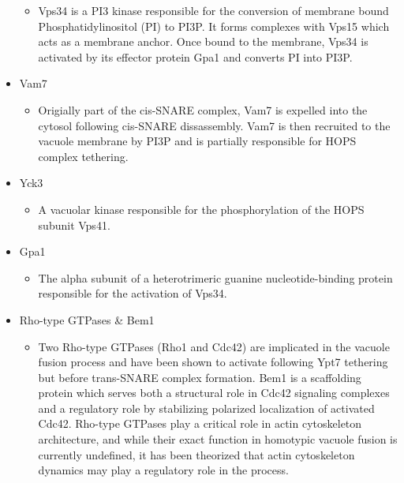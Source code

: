 \documentclass[12pt,twoside]{reedthesis}
\providecommand{\tightlist}{%
  \setlength{\itemsep}{0pt}\setlength{\parskip}{0pt}}
\begin{document}
\begin{itemize}
  \begin{itemize}
  \tightlist
  \item
    Vps34 is a PI3 kinase responsible for the conversion of membrane bound Phosphatidylinositol (PI) to PI3P. It forms complexes with Vps15 which acts as a membrane anchor. Once bound to the membrane, Vps34 is activated by its effector protein Gpa1 and converts PI into PI3P.
  \end{itemize}
\item
  Vam7

  \begin{itemize}
  \tightlist
  \item
    Origially part of the cis-SNARE complex, Vam7 is expelled into the cytosol following cis-SNARE dissassembly. Vam7 is then recruited to the vacuole membrane by PI3P and is partially responsible for HOPS complex tethering.
    \newpage
  \end{itemize}
\item
  Yck3

  \begin{itemize}
  \tightlist
  \item
    A vacuolar kinase responsible for the phosphorylation of the HOPS subunit Vps41.
  \end{itemize}
\item
  Gpa1

  \begin{itemize}
  \tightlist
  \item
    The alpha subunit of a heterotrimeric guanine nucleotide-binding protein responsible for the activation of Vps34.
  \end{itemize}
\item
  Rho-type GTPases \& Bem1

  \begin{itemize}
  \tightlist
  \item
    Two Rho-type GTPases (Rho1 and Cdc42) are implicated in the vacuole fusion process and have been shown to activate following Ypt7 tethering but before trans-SNARE complex formation. Bem1 is a scaffolding protein which serves both a structural role in Cdc42 signaling complexes and a regulatory role by stabilizing polarized localization of activated Cdc42. Rho-type GTPases play a critical role in actin cytoskeleton architecture, and while their exact function in homotypic vacuole fusion is currently undefined, it has been theorized that actin cytoskeleton dynamics may play a regulatory role in the process.
  \end{itemize}
\end{itemize}
\end{document}
